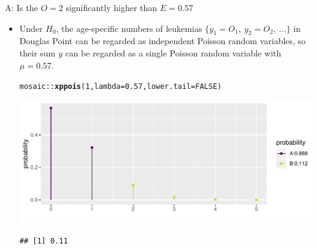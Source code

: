\documentclass[10pt,handout]{beamer}\usepackage[]{graphicx}\usepackage[]{color}
\makeatletter
\def\maxwidth{ %
  \ifdim\Gin@nat@width>\linewidth
    \linewidth
  \else
    \Gin@nat@width
  \fi
}
\newcommand{\hlnum}[1]{\textcolor[rgb]{0.686,0.059,0.569}{#1}}%
\newcommand{\hlopt}[1]{\textcolor[rgb]{0,0,0}{#1}}%
\newcommand{\hlstd}[1]{\textcolor[rgb]{0.345,0.345,0.345}{#1}}%
\newcommand{\hlkwc}[1]{\textcolor[rgb]{0.333,0.667,0.333}{#1}}%
\newcommand{\hlkwd}[1]{\textcolor[rgb]{0.737,0.353,0.396}{\textbf{#1}}}%
\newenvironment{kframe}{%
 \def\at@end@of@kframe{}%
 \ifinner\ifhmode%
  \def\at@end@of@kframe{\end{minipage}}%
  \begin{minipage}{\columnwidth}%
 \fi\fi%
 \def\FrameCommand##1{\hskip\@totalleftmargin \hskip-\fboxsep
 \colorbox{shadecolor}{##1}\hskip-\fboxsep
     \hskip-\linewidth \hskip-\@totalleftmargin \hskip\columnwidth}%
 \MakeFramed {\advance\hsize-\width
   \@totalleftmargin\z@ \linewidth\hsize
   \@setminipage}}%
 {\par\unskip\endMakeFramed%
 \at@end@of@kframe}
\newenvironment{knitrout}{}{} %
\makeatother
\begin{document}
\begin{frame}[fragile]{A: Is the $O=2$ significantly higher than $E=0.57$}
	\small
	\begin{itemize}
		\setlength\itemsep{1.2em}
		\item {} Under  $H_{0}$, the age-specific numbers of leukemias $\{y_{1}=O_{1},\: y_{2}=O_{2},\: \dots \}$ in Douglas Point can be regarded as independent Poisson random variables, so their sum $y$ can be regarded as a single Poisson random variable with $\mu=0.57$. 
		
\begin{knitrout}\tiny
{}\color{fgcolor}\begin{kframe}
\begin{alltt}
\hlstd{mosaic}\hlopt{::}\hlkwd{xppois}\hlstd{(}\hlnum{1}\hlstd{,} \hlkwc{lambda} \hlstd{=} \hlnum{0.57}\hlstd{,} \hlkwc{lower.tail} \hlstd{=} \hlnum{FALSE}\hlstd{)}
\end{alltt}
\end{kframe}

{\centering \includegraphics[width=\maxwidth]{figure/unnamed-chunk-22-1} 

}


\begin{kframe}\begin{verbatim}
## [1] 0.11
\end{verbatim}
\end{kframe}
\end{knitrout}
		
		
	\end{itemize}
	
\end{frame}
\end{document}
